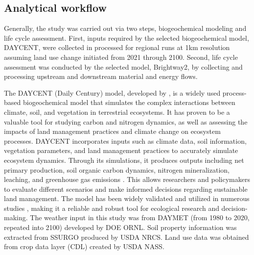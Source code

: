 \documentclass[11pt]{article}
\begin{document}
\subsection*{Analytical workflow}

Generally, the study was carried out via two steps, biogeochemical modeling and life cycle assessment. First, inputs required by the selected biogeochemical model, DAYCENT, were collected in processed for regional runs at 1km resolution assuming land use change initiated from 2021 through 2100. Second, life cycle assessment was conducted by the selected model, Brightway2, by collecting and processing upstream and downstream material and energy flows. 

The DAYCENT (Daily Century) model, developed by \citet{Parton1998DAYCENT}, is a widely used process-based biogeochemical model that simulates the complex interactions between climate, soil, and vegetation in terrestrial ecosystems. It has proven to be a valuable tool for studying carbon and nitrogen dynamics, as well as assessing the impacts of land management practices and climate change on ecosystem processes. DAYCENT incorporates inputs such as climate data, soil information, vegetation parameters, and land management practices to accurately simulate ecosystem dynamics. Through its simulations, it produces outputs including net primary production, soil organic carbon dynamics, nitrogen mineralization, leaching, and greenhouse gas emissions \citep{DelGrosso2005Placeholder,Izaurralde2006EPIC}. This allows researchers and policymakers to evaluate different scenarios and make informed decisions regarding sustainable land management. The model has been widely validated and utilized in numerous studies \citep{Davis2009Placeholder,DelGrosso2006NationalScale,DelGrosso2005Placeholder,Jarecki2020Placeholder,Laub2024Placeholder}, making it a reliable and robust tool for ecological research and decision-making. The weather input in this study was from DAYMET (from 1980 to 2020, repeated into 2100) developed by DOE ORNL. Soil property information was extracted from SSURGO produced by USDA NRCS. Land use data was obtained from crop data layer (CDL) created by USDA NASS.
\end{document}
